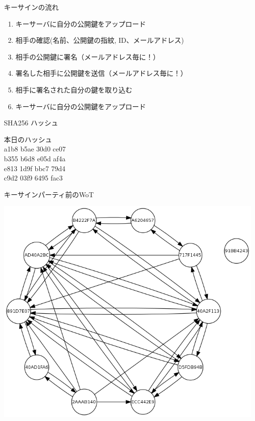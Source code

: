 \begin{frame}{キーサインの流れ}
\begin{enumerate}
  \item キーサーバに自分の公開鍵をアップロード
  \item 相手の確認(名前、公開鍵の指紋, ID、メールアドレス)
  \item 相手の公開鍵に署名（メールアドレス毎に！）
  \item 署名した相手に公開鍵を送信（メールアドレス毎に！）
  \item 相手に署名された自分の鍵を取り込む
  \item キーサーバに自分の公開鍵をアップロード
\end{enumerate}
\end{frame}

\begin{frame}{SHA256 ハッシュ}
\begin{center}
本日のハッシュ\\
\Huge
a1b8 b5ae 30d0 ce07\\
b355 b6d8 e05d af4a\\
e813 1d9f bbc7 79d4\\
c9d2 03f9 6495 fac3\\

\end{center}
\end{frame}


\begin{frame}{キーサインパーティ前のWoT}
\begin{center}
\includegraphics[width=0.8\hsize]{image201111/kof2011-ksp.png}
\end{center}
\end{frame}


